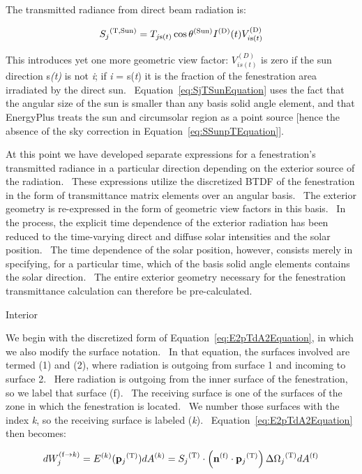 The transmitted radiance from direct beam radiation is:

\begin{equation}
{S_j}^{{\rm{(T, Sun)}}} = {T_{j{\rm{ s}}(t)}}\cos {\theta ^{{\rm{(Sun)}}}}{I^{{\rm{(D)}}}}(t)V_{i{\rm{ s(}}t{\rm{)}}}^{{\rm{(D)}}}
\label{eq:SjTSunEquation}
\end{equation}

This introduces yet one more geometric view factor: $V_{i s(t)}^{(D)}$ is zero if the sun direction s\emph{(t)} is not \emph{i}; if \emph{i} = s(\emph{t}) it is the fraction of the fenestration area irradiated by the direct sun.~ Equation~\ref{eq:SjTSunEquation} uses the fact that the angular size of the sun is smaller than any basis solid angle element, and that EnergyPlus treats the sun and circumsolar region as a point source {[}hence the absence of the sky correction in Equation~\ref{eq:SSunpTEquation}{]}.

At this point we have developed separate expressions for a fenestration's~ transmitted radiance in a particular direction depending on the exterior source of the radiation.~ These expressions utilize the discretized BTDF of the fenestration in the form of transmittance matrix elements over an angular basis.~ The exterior geometry is re-expressed in the form of geometric view factors in this basis.~ In the process, the explicit time dependence of the exterior radiation has been reduced to the time-varying direct and diffuse solar intensities and the solar position.~ The time dependence of the solar position, however, consists merely in specifying, for a particular time, which of the basis solid angle elements contains the solar direction.~ The entire exterior geometry necessary for the fenestration transmittance calculation can therefore be pre-calculated.

Interior

We begin with the discretized form of Equation~\ref{eq:E2pTdA2Equation}, in which we also modify the surface notation.~ In that equation, the surfaces involved are termed (1) and (2), where radiation is outgoing from surface 1 and incoming to surface 2.~ Here radiation is outgoing from the inner surface of the fenestration, so we label that surface (f).~ The receiving surface is one of the surfaces of the zone in which the fenestration is located.~ We number those surfaces with the index \emph{k}, so the receiving surface is labeled (\emph{k}).~ Equation~\ref{eq:E2pTdA2Equation} then becomes:

\begin{equation}
dW_j^{{\rm{(f}} \to k{\rm{)}}} = {E^{{\rm{(}}k{\rm{)}}}}({{\bf{p}}_j}^{{\rm{(T)}}})d{A^{{\rm{(}}k{\rm{)}}}} = {S_j}^{{\rm{(T)}}} \cdot \left( {{{\bf{n}}^{{\rm{(f)}}}} \cdot {{\bf{p}}_j}^{{\rm{(T)}}}} \right)\Delta {\Omega_j}^{{\rm{(T)}}}d{A^{{\rm{(f)}}}}
\end{equation}

